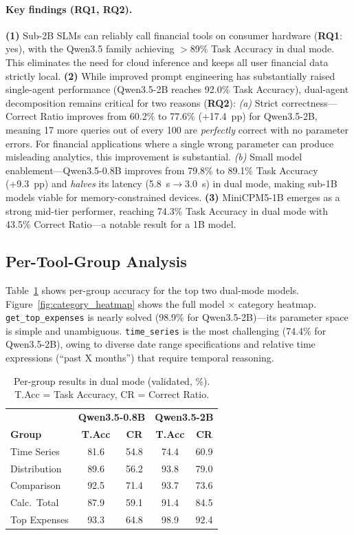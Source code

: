 \documentclass[11pt,twocolumn]{article}
\begin{document}
\paragraph{Key findings (RQ1, RQ2).}
\textbf{(1)} Sub-2B SLMs can reliably call financial tools on consumer hardware (\textbf{RQ1}: yes), with the Qwen3.5 family achieving $>$89\% Task Accuracy in dual mode.
This eliminates the need for cloud inference and keeps all user financial data strictly local.
\textbf{(2)} While improved prompt engineering has substantially raised single-agent performance (Qwen3.5-2B reaches 92.0\% Task Accuracy), dual-agent decomposition remains critical for two reasons (\textbf{RQ2}):
\emph{(a)} Strict correctness---Correct Ratio improves from 60.2\% to 77.6\% (+17.4~pp) for Qwen3.5-2B, meaning 17 more queries out of every 100 are \emph{perfectly} correct with no parameter errors.
For financial applications where a single wrong parameter can produce misleading analytics, this improvement is substantial.
\emph{(b)} Small model enablement---Qwen3.5-0.8B improves from 79.8\% to 89.1\% Task Accuracy (+9.3~pp) and \emph{halves} its latency (5.8~s$\to$3.0~s) in dual mode, making sub-1B models viable for memory-constrained devices.
\textbf{(3)} MiniCPM5-1B emerges as a strong mid-tier performer, reaching 74.3\% Task Accuracy in dual mode with 43.5\% Correct Ratio---a notable result for a 1B model.

\subsection{Per-Tool-Group Analysis}

Table~\ref{tab:category_results} shows per-group accuracy for the top two dual-mode models.
Figure~\ref{fig:category_heatmap} shows the full model $\times$ category heatmap.
\texttt{get\_top\_expenses} is nearly solved (98.9\% for Qwen3.5-2B)---its parameter space is simple and unambiguous.
\texttt{time\_series} is the most challenging (74.4\% for Qwen3.5-2B), owing to diverse date range specifications and relative time expressions (``past X months'') that require temporal reasoning.

\begin{table}[t]
\centering
\small
\begin{tabular}{@{}l|cc|cc@{}}
\toprule
& \multicolumn{2}{c|}{\textbf{Qwen3.5-0.8B}} & \multicolumn{2}{c}{\textbf{Qwen3.5-2B}} \\
\textbf{Group} & \textbf{T.Acc} & \textbf{CR} & \textbf{T.Acc} & \textbf{CR} \\
\midrule
Time Series  & 81.6 & 54.8 & 74.4 & 60.9 \\
Distribution & 89.6 & 56.2 & 93.8 & 79.0 \\
Comparison   & 92.5 & 71.4 & 93.7 & 73.6 \\
Calc.\ Total & 87.9 & 59.1 & 91.4 & 84.5 \\
Top Expenses & 93.3 & 64.8 & 98.9 & 92.4 \\
\bottomrule
\end{tabular}
\caption{Per-group results in dual mode (validated, \%). T.Acc = Task Accuracy, CR = Correct Ratio.}
\label{tab:category_results}
\end{table}
\end{document}
